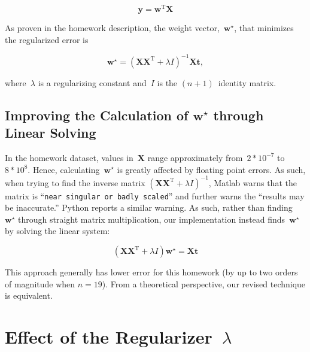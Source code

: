 \documentclass{report}
\newcommand{\wstar}{\mathbf{w}^{\star}}
\begin{document}
  \begin{equation}
    \mathbf{y}=\mathbf{w}^{\text{T}}\mathbf{X}
  \end{equation}\label{eq:tensorFunction}
  
  \noindent
  As proven in the homework description, the weight vector,~$\wstar$, that minimizes the regularized error is
  
  \begin{equation}
    \wstar=(\mathbf{X}\mathbf{X}^{\text{T}} + \lambda I)^{-1}\mathbf{X}\mathbf{t},
  \end{equation}\label{eq:wstarDef}
  
  \noindent
  where~$\lambda$ is a regularizing constant and~$I$ is the $(n+1)$~identity matrix.
  
  \subsection{Improving the Calculation of $\wstar$ through Linear Solving}
  
  In the homework dataset, values in~$\mathbf{X}$ range approximately from~${2*10^{-7}}$ to~${8*10^{8}}$.  Hence, calculating~$\wstar$ is greatly affected by floating point errors.  As such, when trying to find the inverse matrix ${(\mathbf{X}\mathbf{X}^{\text{T}} + \lambda I)^{-1}}$, Matlab warns that the matrix is ``\texttt{near singular or badly scaled}''  and further warns the ``results may be inaccurate.''  Python reports a similar warning.  As such, rather than finding~$\wstar$ through straight matrix multiplication, our implementation instead finds~$\wstar$ by solving the linear system:
    
  \begin{equation}
    (\mathbf{X}\mathbf{X}^{\text{T}} + \lambda I)\wstar=\mathbf{X}\mathbf{t}
  \end{equation}
  
  \noindent
  This approach generally has lower error for this homework (by up to two orders of magnitude when $n=19$).  From a theoretical perspective, our revised technique is equivalent.
      
  \section{Effect of the Regularizer~$\lambda$}
  
\end{document}
